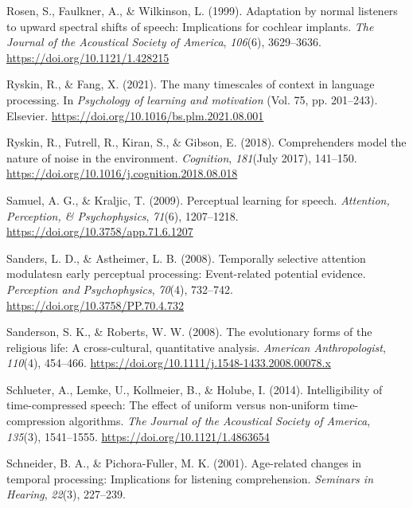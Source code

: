 \documentclass[a4paper, nobind]{templates/ociamthesis}
\newlength{\cslhangindent}
\newenvironment{CSLReferences}[2] %
 {%
  \setlength{\parindent}{0pt}
  \ifodd #1
  \let\oldpar\par
  \def\par{\hangindent=\cslhangindent\oldpar}
  \fi
  \setlength{\parskip}{1mm}
  \setlength{\baselineskip}{6mm}
 }%
 {}
\begin{document}
\begin{CSLReferences}{1}{0}
\leavevmode{}%
Rosen, S., Faulkner, A., \& Wilkinson, L. (1999). Adaptation by normal listeners to upward spectral shifts of speech: Implications for cochlear implants. \emph{The Journal of the Acoustical Society of America}, \emph{106}(6), 3629--3636. \url{https://doi.org/10.1121/1.428215}

\leavevmode{}%
Ryskin, R., \& Fang, X. (2021). The many timescales of context in language processing. In \emph{Psychology of learning and motivation} (Vol. 75, pp. 201--243). Elsevier. \url{https://doi.org/10.1016/bs.plm.2021.08.001}

\leavevmode{}%
Ryskin, R., Futrell, R., Kiran, S., \& Gibson, E. (2018). {Comprehenders model the nature of noise in the environment}. \emph{Cognition}, \emph{181}(July 2017), 141--150. \url{https://doi.org/10.1016/j.cognition.2018.08.018}

\leavevmode{}%
Samuel, A. G., \& Kraljic, T. (2009). Perceptual learning for speech. \emph{Attention, Perception, \& Psychophysics}, \emph{71}(6), 1207--1218. \url{https://doi.org/10.3758/app.71.6.1207}

\leavevmode{}%
Sanders, L. D., \& Astheimer, L. B. (2008). {Temporally selective attention modulatesn early perceptual processing: Event-related potential evidence}. \emph{Perception and Psychophysics}, \emph{70}(4), 732--742. \url{https://doi.org/10.3758/PP.70.4.732}

\leavevmode{}%
Sanderson, S. K., \& Roberts, W. W. (2008). {The evolutionary forms of the religious life: A cross-cultural, quantitative analysis}. \emph{American Anthropologist}, \emph{110}(4), 454--466. \url{https://doi.org/10.1111/j.1548-1433.2008.00078.x}

\leavevmode{}%
Schlueter, A., Lemke, U., Kollmeier, B., \& Holube, I. (2014). {Intelligibility of time-compressed speech: The effect of uniform versus non-uniform time-compression algorithms}. \emph{The Journal of the Acoustical Society of America}, \emph{135}(3), 1541--1555. \url{https://doi.org/10.1121/1.4863654}

\leavevmode{}%
Schneider, B. A., \& Pichora-Fuller, M. K. (2001). Age-related changes in temporal processing: Implications for listening comprehension. \emph{Seminars in Hearing}, \emph{22}(3), 227--239.


\end{CSLReferences}
\end{document}
